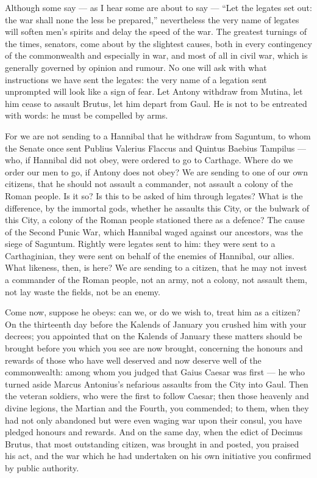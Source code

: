  Although some say --- as I hear some are about to say --- ``Let the legates set out: the war shall none the less be prepared,'' nevertheless the very name of legates will soften men's spirits and delay the speed of the war. The greatest turnings of the times, senators, come about by the slightest causes, both in every contingency of the commonwealth and especially in war, and most of all in civil war, which is generally governed by opinion and rumour. No one will ask with what instructions we have sent the legates: the very name of a legation sent unprompted will look like a sign of fear. Let Antony withdraw from Mutina, let him cease to assault Brutus, let him depart from Gaul. He is not to be entreated with words: he must be compelled by arms.

 For we are not sending to a Hannibal that he withdraw from Saguntum, to whom the Senate once sent Publius Valerius Flaccus and Quintus Baebius Tampilus --- who, if Hannibal did not obey, were ordered to go to Carthage. Where do we order our men to go, if Antony does not obey? We are sending to one of our own citizens, that he should not assault a commander, not assault a colony of the Roman people. Is it so? Is this to be asked of him through legates? What is the difference, by the immortal gods, whether he assaults this City, or the bulwark of this City, a colony of the Roman people stationed there as a defence? The cause of the Second Punic War, which Hannibal waged against our ancestors, was the siege of Saguntum. Rightly were legates sent to him: they were sent to a Carthaginian, they were sent on behalf of the enemies of Hannibal, our allies. What likeness, then, is here? We are sending to a citizen, that he may not invest a commander of the Roman people, not an army, not a colony, not assault them, not lay waste the fields, not be an enemy.

 Come now, suppose he obeys: can we, or do we wish to, treat him as a citizen? On the thirteenth day before the Kalends of January you crushed him with your decrees; you appointed that on the Kalends of January these matters should be brought before you which you see are now brought, concerning the honours and rewards of those who have well deserved and now deserve well of the commonwealth: among whom you judged that Gaius Caesar was first --- he who turned aside Marcus Antonius's nefarious assaults from the City into Gaul. Then the veteran soldiers, who were the first to follow Caesar; then those heavenly and divine legions, the Martian and the Fourth, you commended; to them, when they had not only abandoned but were even waging war upon their consul, you have pledged honours and rewards. And on the same day, when the edict of Decimus Brutus, that most outstanding citizen, was brought in and posted, you praised his act, and the war which he had undertaken on his own initiative you confirmed by public authority.

